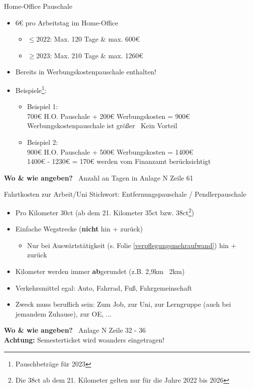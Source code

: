 \documentclass{beamer}
\begin{document}
			\begin{frame}{Home-Office Pauschale}
				\begin{itemize}
					\item 6€ pro Arbeitstag im Home-Office
					\begin{itemize}
						\item $\leq2022$: Max. 120 Tage \& max. 600€
						\item $\geq2023$: Max. 210 Tage \& max. 1260€
					\end{itemize}
					\item Bereits in Werbungskostenpauschale enthalten!\pause
					\item Beispiele\footnote{Pauschbeträge für 2023}:
					\begin{itemize}
						\item Beispiel 1:\\
						700€ H.O. Pauschale + 200€ Werbungskosten = 900€\\
						Werbungskostenpauschale ist größer \textrightarrow\ Kein Vorteil\pause
						\item Beispiel 2:\\
						900€ H.O. Pauschale + 500€ Werbungskosten = 1400€\\
						1400€ - 1230€ = 170€ werden vom Finanzamt berücksichtigt
					\end{itemize}
				\end{itemize}
				\pause
				\textbf{Wo \& wie angeben?} \textrightarrow\ Anzahl an Tagen in Anlage N Zeile 61
			\end{frame}
		
			\begin{frame}{Fahrtkosten zur Arbeit/Uni}
				Stichwort: Entfernungspauschale / Pendlerpauschale\n
				
				\begin{itemize}
					\item Pro Kilometer 30ct (ab dem 21. Kilometer 35ct bzw. 38ct\footnote{Die 38ct ab dem 21. Kilometer gelten nur für die Jahre 2022 bis 2026})
					\item Einfache Wegstrecke (\textbf{nicht} hin + zurück)
					\begin{itemize}
						\item Nur bei Auswärtstätigkeit (s. Folie \ref{verpflegungsmehraufwand}) hin + zurück
					\end{itemize}
					\item Kilometer werden immer \textbf{ab}gerundet (z.B. 2,9km \textrightarrow\ 2km)
					\item Verkehrsmittel egal: Auto, Fahrrad, Fuß, Fahrgemeinschaft
					\item Zweck muss beruflich sein: Zum Job, zur Uni, zur Lerngruppe (auch bei jemandem Zuhause), zur OE, ...
				\end{itemize}\n\pause
				\textbf{Wo \& wie angeben?} \textrightarrow\ Anlage N Zeile 32 - 36\\\pause
				\textbf{Achtung:} Semesterticket wird woanders eingetragen!
			\end{frame}
			
\end{document}
